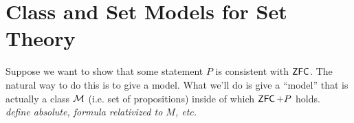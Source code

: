 \documentclass{amsart}
\DeclareMathOperator{\ZFC}{\sf{ZFC}}
\begin{document}
	\section{Class and Set Models for Set Theory}
	Suppose we want to show that some statement $P$ is consistent with $\ZFC$. The natural way to do this is to give a model. What we'll do is give a ``model'' that is actually a class $\mathcal{M}$ (i.e. set of propositions) inside of which $\ZFC + P$ holds. \\
%	

\textit{define absolute, formula relativized to $M$, etc.}\\
	
\end{document}
